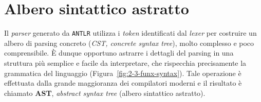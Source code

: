 \section{Albero sintattico astratto}
\label{sec:5-4-abstract-syntax-tree}

Il \textit{parser} generato da \texttt{ANTLR} utilizza i \textit{token} identificati dal \textit{lexer} per costruire
un albero di parsing concreto (\textit{CST, concrete syntax tree}), molto complesso e poco comprensibile.
È dunque opportuno astrarre i dettagli del parsing in una struttura più semplice e facile da interpretare,
che rispecchia precisamente la grammatica del linguaggio (Figura~\ref{fig:2-3-funx-syntax}).
Tale operazione è effettuata dalla grande maggioranza dei compilatori moderni e il risultato è chiamato
\textbf{AST}, \textit{abstract syntax tree} (albero sintattico astratto).



\newpage


